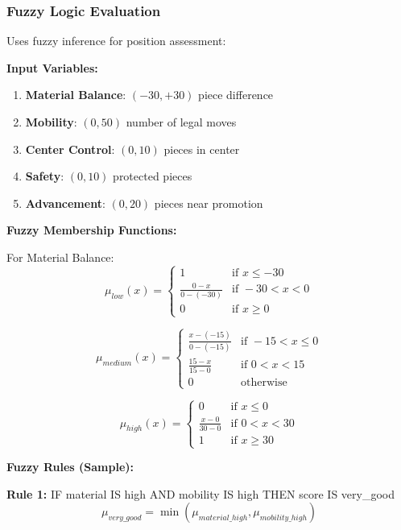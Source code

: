 \documentclass[12pt,a4paper]{article}
\begin{document}
\subsubsection{Fuzzy Logic Evaluation}

Uses fuzzy inference for position assessment:

\textbf{Input Variables:}
\begin{enumerate}
    \item \textbf{Material Balance}: $(-30, +30)$ piece difference
    \item \textbf{Mobility}: $(0, 50)$ number of legal moves
    \item \textbf{Center Control}: $(0, 10)$ pieces in center
    \item \textbf{Safety}: $(0, 10)$ protected pieces
    \item \textbf{Advancement}: $(0, 20)$ pieces near promotion
\end{enumerate}

\textbf{Fuzzy Membership Functions:}

For Material Balance:
\begin{equation}
\mu_{low}(x) = \begin{cases}
1 & \text{if } x \leq -30 \\
\frac{0-x}{0-(-30)} & \text{if } -30 < x < 0 \\
0 & \text{if } x \geq 0
\end{cases}
\end{equation}

\begin{equation}
\mu_{medium}(x) = \begin{cases}
\frac{x-(-15)}{0-(-15)} & \text{if } -15 < x \leq 0 \\
\frac{15-x}{15-0} & \text{if } 0 < x < 15 \\
0 & \text{otherwise}
\end{cases}
\end{equation}

\begin{equation}
\mu_{high}(x) = \begin{cases}
0 & \text{if } x \leq 0 \\
\frac{x-0}{30-0} & \text{if } 0 < x < 30 \\
1 & \text{if } x \geq 30
\end{cases}
\end{equation}

\textbf{Fuzzy Rules (Sample):}

\textbf{Rule 1:} IF material IS high AND mobility IS high THEN score IS very\_good
\begin{equation}
\mu_{very\_good} = \min(\mu_{material\_high}, \mu_{mobility\_high})
\end{equation}
\end{document}
